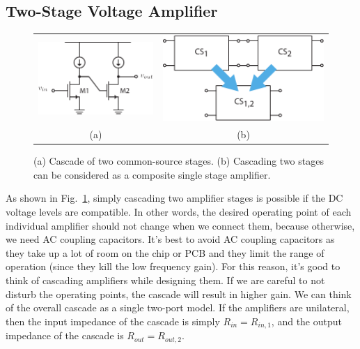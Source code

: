 


\subsection{Two-Stage Voltage Amplifier}


\begin{figure}[tb]
\begin{center}
\begin{tabular}{cc}
\includegraphics[scale=1]{cs_cascade_sch} &
\includegraphics[width=.5\columnwidth]{1cascade} \\
(a) & (b) \\
\end{tabular}
\end{center}
\caption{(a) Cascade of two common-source stages.  (b) Cascading two stages can be considered as a composite single stage amplifier.} \label{fig:1cascade}
\end{figure}

As shown in Fig.~\ref{fig:1cascade}, simply cascading two amplifier stages is possible if the DC voltage levels are compatible. In other words, the desired operating point of each individual amplifier should not change when we connect them, because otherwise, we need AC coupling capacitors.  It's best to avoid AC coupling capacitors as they take up a lot of room on the chip or PCB and they limit the range of operation (since they kill the low frequency gain).  For this reason, it's good to think of cascading amplifiers while designing them.  If we are careful to not disturb the operating points, the cascade will result in higher gain.  We can think of the overall cascade as a single two-port model.  If the amplifiers are unilateral, then the input impedance of the cascade is simply  $R_{in} = R_{in,1}$, and the output impedance of the cascade is $R_{out} = R_{out,2}$.

